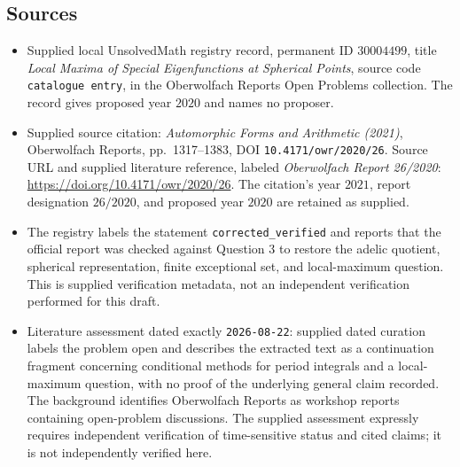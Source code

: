\documentclass[11pt]{article}
\begin{document}
\subsection{Sources}
\begin{itemize}
\item Supplied local UnsolvedMath registry record, permanent ID \(30004499\), title \emph{Local Maxima of Special Eigenfunctions at Spherical Points}, source code \texttt{catalogue entry}, in the Oberwolfach Reports Open Problems collection. The record gives proposed year \(2020\) and names no proposer.
\item Supplied source citation: \emph{Automorphic Forms and Arithmetic (2021)}, Oberwolfach Reports, pp.\ 1317--1383, DOI \texttt{10.4171/owr/2020/26}. Source URL and supplied literature reference, labeled \emph{Oberwolfach Report 26/2020}: \url{https://doi.org/10.4171/owr/2020/26}. The citation's year \(2021\), report designation \(26/2020\), and proposed year \(2020\) are retained as supplied.
\item The registry labels the statement \texttt{corrected\_verified} and reports that the official report was checked against Question 3 to restore the adelic quotient, spherical representation, finite exceptional set, and local-maximum question. This is supplied verification metadata, not an independent verification performed for this draft.
\item Literature assessment dated exactly \texttt{2026-08-22}: supplied dated curation labels the problem open and describes the extracted text as a continuation fragment concerning conditional methods for period integrals and a local-maximum question, with no proof of the underlying general claim recorded. The background identifies Oberwolfach Reports as workshop reports containing open-problem discussions. The supplied assessment expressly requires independent verification of time-sensitive status and cited claims; it is not independently verified here.
\end{itemize}
\end{document}
